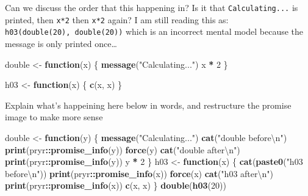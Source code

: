 \documentclass[]{book}
\newenvironment{Shaded}{\begin{snugshade}}{\end{snugshade}}
\newcommand{\CharTok}[1]{\textcolor[rgb]{0.31,0.60,0.02}{#1}}
\newcommand{\ControlFlowTok}[1]{\textcolor[rgb]{0.13,0.29,0.53}{\textbf{#1}}}
\newcommand{\DecValTok}[1]{\textcolor[rgb]{0.00,0.00,0.81}{#1}}
\newcommand{\KeywordTok}[1]{\textcolor[rgb]{0.13,0.29,0.53}{\textbf{#1}}}
\newcommand{\NormalTok}[1]{#1}
\newcommand{\OperatorTok}[1]{\textcolor[rgb]{0.81,0.36,0.00}{\textbf{#1}}}
\newcommand{\StringTok}[1]{\textcolor[rgb]{0.31,0.60,0.02}{#1}}
\begin{document}
Can we discuss the order that this happening in? Is it that \texttt{Calculating...} is printed, then \texttt{x*2} then \texttt{x*2} again? I am still reading this as: \texttt{h03(double(20),\ double(20))} which is an incorrect mental model because the message is only printed once\ldots{}

\begin{Shaded}
\begin{Highlighting}[]
\NormalTok{double <-}\StringTok{ }\ControlFlowTok{function}\NormalTok{(x) \{ }
  \KeywordTok{message}\NormalTok{(}\StringTok{"Calculating..."}\NormalTok{)}
\NormalTok{  x }\OperatorTok{*}\StringTok{ }\DecValTok{2}
\NormalTok{\}}

\NormalTok{h03 <-}\StringTok{ }\ControlFlowTok{function}\NormalTok{(x) \{}
  \KeywordTok{c}\NormalTok{(x, x)}
\NormalTok{\}}
\end{Highlighting}
\end{Shaded}

Explain what's happeining here below in words, and restructure the promise image to make more sense

\begin{Shaded}
\begin{Highlighting}[]
\NormalTok{double <-}\StringTok{ }\ControlFlowTok{function}\NormalTok{(y) \{}
  \KeywordTok{message}\NormalTok{(}\StringTok{"Calculating..."}\NormalTok{)}
  \KeywordTok{cat}\NormalTok{(}\StringTok{"double before}\CharTok{\textbackslash{}n}\StringTok{"}\NormalTok{)}
  \KeywordTok{print}\NormalTok{(pryr}\OperatorTok{::}\KeywordTok{promise_info}\NormalTok{(y))}
  \KeywordTok{force}\NormalTok{(y)}
  \KeywordTok{cat}\NormalTok{(}\StringTok{"double after}\CharTok{\textbackslash{}n}\StringTok{"}\NormalTok{)}
  \KeywordTok{print}\NormalTok{(pryr}\OperatorTok{::}\KeywordTok{promise_info}\NormalTok{(y))}
\NormalTok{  y }\OperatorTok{*}\StringTok{ }\DecValTok{2}
\NormalTok{\}}
\NormalTok{h03 <-}\StringTok{ }\ControlFlowTok{function}\NormalTok{(x) \{}
  \KeywordTok{cat}\NormalTok{(}\KeywordTok{paste0}\NormalTok{(}\StringTok{"h03 before}\CharTok{\textbackslash{}n}\StringTok{"}\NormalTok{))}
  \KeywordTok{print}\NormalTok{(pryr}\OperatorTok{::}\KeywordTok{promise_info}\NormalTok{(x))}
  \KeywordTok{force}\NormalTok{(x)}
  \KeywordTok{cat}\NormalTok{(}\StringTok{"h03 after}\CharTok{\textbackslash{}n}\StringTok{"}\NormalTok{)}
  \KeywordTok{print}\NormalTok{(pryr}\OperatorTok{::}\KeywordTok{promise_info}\NormalTok{(x))}
  \KeywordTok{c}\NormalTok{(x, x)}
\NormalTok{\}}
\KeywordTok{double}\NormalTok{(}\KeywordTok{h03}\NormalTok{(}\DecValTok{20}\NormalTok{))}
\end{Highlighting}
\end{Shaded}
\end{document}

